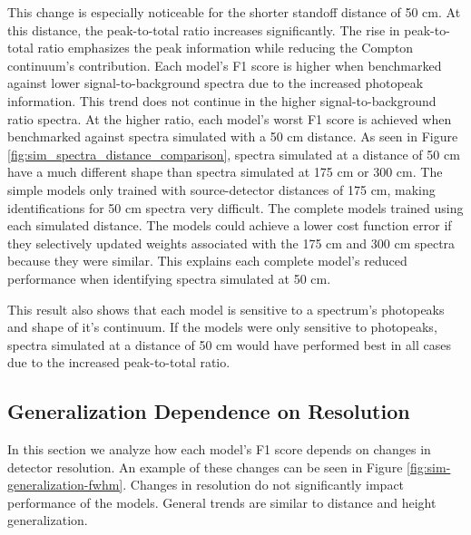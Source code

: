 This change is especially noticeable for the shorter standoff distance of 50 cm. At this distance, the peak-to-total ratio increases significantly. The rise in peak-to-total ratio emphasizes the peak information while reducing the Compton continuum's contribution. Each model's F1 score is higher when benchmarked against lower signal-to-background spectra due to the increased photopeak information. This trend does not continue in the higher signal-to-background ratio spectra. At the higher ratio, each model's worst F1 score is achieved when benchmarked against spectra simulated with a 50 cm distance. As seen in Figure \ref{fig:sim_spectra_distance_comparison}, spectra simulated at a distance of 50 cm have a much different shape than spectra simulated at 175 cm or 300 cm. The simple models only trained with source-detector distances of 175 cm, making identifications for 50 cm spectra very difficult. The complete models trained using each simulated distance. The models could achieve a lower cost function error if they selectively updated weights associated with the 175 cm and 300 cm spectra because they were similar. This explains each complete model's reduced performance when identifying spectra simulated at 50 cm. 

This result also shows that each model is sensitive to a spectrum's photopeaks and shape of it's continuum. If the models were only sensitive to photopeaks, spectra simulated at a distance of 50 cm would have performed best in all cases due to the increased peak-to-total ratio.



\subsection{Generalization Dependence on Resolution}

In this section we analyze how each model's F1 score depends on changes in detector resolution. An example of these changes can be seen in Figure \ref{fig:sim-generalization-fwhm}. Changes in resolution do not significantly impact performance of the models. General trends are similar to distance and height generalization. 

